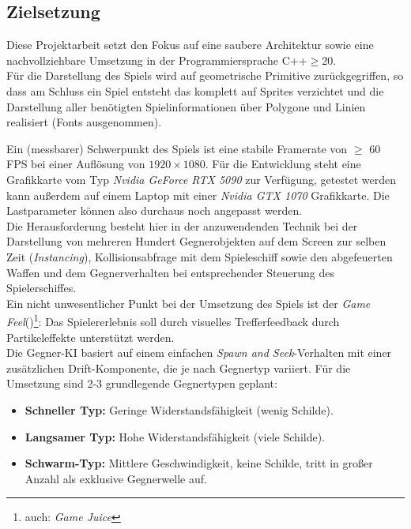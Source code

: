 \subsection{Zielsetzung}

Diese Projektarbeit setzt den Fokus auf eine saubere Architektur sowie eine nachvollziehbare Umsetzung in der Programmiersprache C++$\ge$20.\\
Für die Darstellung des Spiels wird auf geometrische Primitive zurückgegriffen, so dass am Schluss ein Spiel entsteht das komplett auf Sprites verzichtet und die Darstellung aller benötigten Spielinformationen über Polygone und Linien realisiert (Fonts ausgenommen).

\noindent
Ein (messbarer) Schwerpunkt des Spiels ist eine stabile Framerate von $\ge$ 60 FPS bei einer Auflösung von $1920 \times 1080$.
Für die Entwicklung steht eine Grafikkarte vom Typ \textit{Nvidia GeForce RTX 5090} zur Verfügung, getestet werden kann außerdem auf einem Laptop mit einer \textit{Nvidia GTX 1070} Grafikkarte.
Die Lastparameter können also durchaus noch angepasst werden.\\
Die Herausforderung besteht hier in der anzuwendenden Technik bei der Darstellung von mehreren Hundert Gegnerobjekten auf dem Screen zur selben Zeit (\textit{Instancing}), Kollisionsabfrage mit dem Spieleschiff sowie den abgefeuerten Waffen und dem Gegnerverhalten bei entsprechender Steuerung des Spielerschiffes.\\
Ein nicht unwesentlicher Punkt bei der Umsetzung des Spiels ist der \textit{Game Feel}(\cite{Swi09})\footnote{
auch: \textit{Game Juice}
}: Das Spielererlebnis soll durch visuelles Trefferfeedback durch Partikeleffekte unterstützt werden.\\

\noindent
Die Gegner-KI basiert auf einem einfachen \textit{Spawn and Seek}-Verhalten mit einer zusätzlichen Drift-Komponente, die je nach Gegnertyp variiert. Für die Umsetzung sind 2-3 grundlegende Gegnertypen geplant:
\begin{itemize}
\itemsep0.5em
\item \textbf{Schneller Typ:} Geringe Widerstandsfähigkeit (wenig Schilde).
\item \textbf{Langsamer Typ:} Hohe Widerstandsfähigkeit (viele Schilde).
\item \textbf{Schwarm-Typ:} Mittlere Geschwindigkeit, keine Schilde, tritt in großer Anzahl als exklusive Gegnerwelle auf.
\end{itemize}

